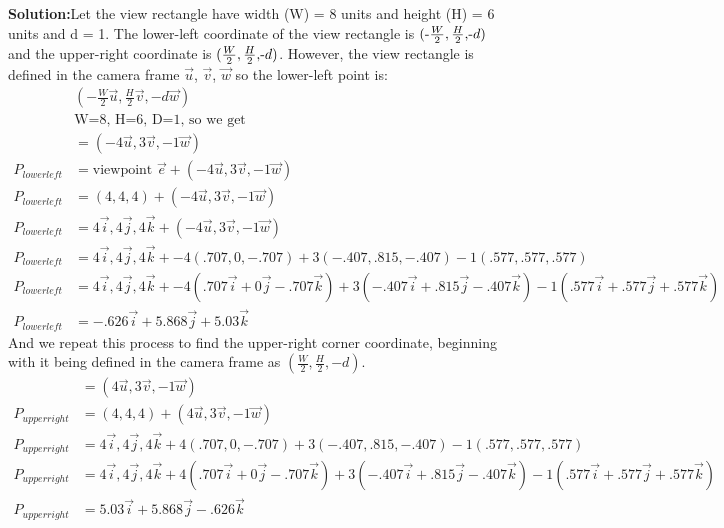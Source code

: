 \documentclass[a4paper, 12pt]{article}
\begin{document}
\begin{enumerate}
        \textbf{Solution:}Let the view rectangle have width (W) = 8 units and height (H) = 6 units and d = 1. The lower-left coordinate of the view rectangle is \( ( $-$\frac{W}{2}, \frac{H}{2}, $-$d) \) and the upper-right coordinate is \( (\frac{W}{2}, \frac{H}{2}, $-$d) \). However, the view rectangle is defined in the camera frame $\vec{u}$, $\vec{v}$, $\vec{w}$ so the lower-left point is:
        \begin{align*}
            &( -\frac{W}{2}\vec{u}, \frac{H}{2}\vec{v}, -d\vec{w})\\
            &\text{W=8, H=6, D=1, so we get}\\
            &= (-4\vec{u}, 3\vec{v}, -1\vec{w})\\
            P_{lower left} &= \text{viewpoint $\vec{e}$} + (-4\vec{u}, 3\vec{v}, -1\vec{w})\\
            P_{lower left} &= (4,4,4) + (-4\vec{u}, 3\vec{v}, -1\vec{w})\\
            P_{lower left} &= 4\vec{i}, 4\vec{j}, 4\vec{k} + (-4\vec{u}, 3\vec{v}, -1\vec{w})\\
            P_{lower left} &= 4\vec{i}, 4\vec{j}, 4\vec{k} + -4(.707, 0, -.707) + 3(-.407, .815, -.407) - 1(.577, .577, .577)\\
            P_{lower left} &= 4\vec{i}, 4\vec{j}, 4\vec{k} + -4(.707\vec{i} + 0\vec{j} - .707\vec{k}) + 3(-.407\vec{i} + .815\vec{j} - .407\vec{k}) - 1(.577\vec{i} + .577\vec{j} + .577\vec{k})\\
            P_{lower left} &= -.626\vec{i} + 5.868\vec{j} + 5.03\vec{k}
        \end{align*}
        And we repeat this process to find the upper-right corner coordinate, beginning with it being defined in the camera frame as \( (\frac{W}{2}, \frac{H}{2}, -d) \).
        \begin{align*}
            &= (4\vec{u}, 3\vec{v}, -1\vec{w})\\
            P_{upper right} &= (4,4,4) + (4\vec{u}, 3\vec{v}, -1\vec{w})\\
            P_{upper right} &= 4\vec{i}, 4\vec{j}, 4\vec{k} + 4(.707, 0, -.707) + 3(-.407, .815, -.407) - 1(.577, .577, .577)\\
            P_{upper right} &= 4\vec{i}, 4\vec{j}, 4\vec{k} + 4(.707\vec{i} + 0\vec{j} - .707\vec{k}) + 3(-.407\vec{i} + .815\vec{j} - .407\vec{k}) - 1(.577\vec{i} + .577\vec{j} + .577\vec{k})\\
            P_{upper right} &= 5.03\vec{i} + 5.868\vec{j} -.626\vec{k}
        \end{align*}


\end{enumerate}
\end{document}

